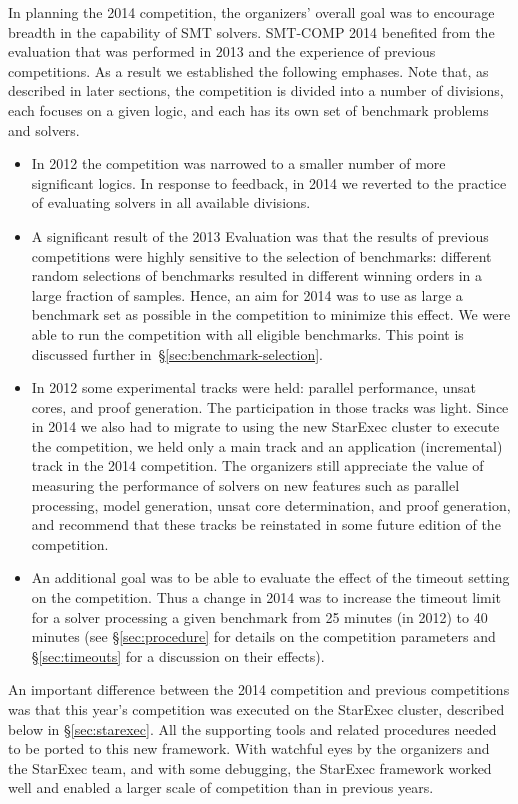 \documentclass[twoside,11pt]{article}
\begin{document}
In planning the 2014 competition, the organizers' overall goal was to encourage breadth in the capability of SMT solvers.  SMT-COMP 2014 benefited from the evaluation that was performed in 2013 and the experience of previous competitions.  As a result we established the following emphases.  Note that, as described in later sections, the competition is divided into a number of divisions, each focuses on a given logic, and each has its own set of benchmark problems and solvers.
\begin{itemize}
\item In 2012 the competition was narrowed to a smaller number of more significant logics. In response to feedback, in 2014 we reverted to the practice of evaluating solvers in all available divisions.
\item A significant result of the 2013 Evaluation was that the results of previous competitions were highly sensitive to the selection of benchmarks: different random selections of benchmarks resulted in different winning orders in a large fraction of samples. Hence, an aim for 2014 was to use as large a benchmark set as possible in the competition to minimize this effect. We were able to run the competition with all eligible benchmarks. This point is discussed further in~\S\ref{sec:benchmark-selection}.
\item In 2012 some experimental tracks were held: parallel performance, unsat cores, and proof generation. The participation in those tracks was light. Since in 2014 we also had to migrate to using the new StarExec cluster to execute the competition, we held only a main track and an application (incremental) track in the 2014 competition. The organizers still appreciate the value of measuring the performance of solvers on new features such as parallel processing, model generation, unsat core determination, and proof generation, and recommend that these tracks be reinstated in some future edition of the competition.
\item An additional goal was to be able to evaluate the effect of the timeout setting on the competition. Thus a change in 2014 was to increase the timeout limit for a solver processing a given benchmark from 25 minutes (in 2012) to 40 minutes (see \S\ref{sec:procedure} for details on the competition parameters and \S\ref{sec:timeouts} for a discussion on their effects).
\end{itemize}

An important difference between the 2014 competition and previous competitions was that this year's competition was executed on the StarExec cluster, described below in \S\ref{sec:starexec}. All the supporting tools and related procedures needed to be ported to this new framework. With watchful eyes by the organizers and the StarExec team, and with some debugging, the StarExec framework worked well and enabled a larger scale of competition than in previous years.
\end{document}
